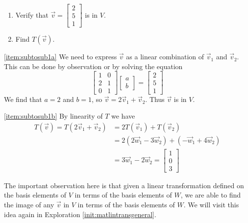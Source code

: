 \documentclass{ximera}
\begin{document}
\begin{example}
\begin{enumerate}
\item \label{item:subtosub1a}
Verify that $\vec{v}=\begin{bmatrix}2\\5\\1\end{bmatrix}$ is in $V$.
\item\label{item:subtosub1b}
Find $T(\vec{v})$.
\end{enumerate}
\begin{explanation}
\ref{item:subtosub1a} We need to express $\vec{v}$ as a linear combination of $\vec{v}_1$ and $\vec{v}_2$.  This can be done by observation or by solving the equation
$$\begin{bmatrix}1&0\\2&1\\0&1\end{bmatrix}\begin{bmatrix}a\\b\end{bmatrix}=\begin{bmatrix}2\\5\\1\end{bmatrix}$$
We find that $a=2$ and $b=1$, so $\vec{v}=2\vec{v}_1+\vec{v}_2$.  Thus $\vec{v}$ is in $V$.

\ref{item:subtosub1b} By linearity of $T$ we have \begin{align*}T(\vec{v})=T(2\vec{v}_1+\vec{v}_2)&=2T(\vec{v}_1)+T(\vec{v}_2)\\&=2(2\vec{w}_1-3\vec{w}_2)+(-\vec{w}_1+4\vec{w}_2)\\&=3\vec{w}_1-2\vec{w}_2=\begin{bmatrix}1\\0\\3\end{bmatrix}
\end{align*}

The important observation here is that given a linear transformation defined on the basis elements of $V$ in terms of the basis elements of $W$, we are able to find the image of any $\vec{v}$ in $V$ in terms of the basis elements of $W$. We will visit this idea again in Exploration \ref{init:matlintransgeneral}.

\end{explanation}

\end{example}

 
\end{document}
